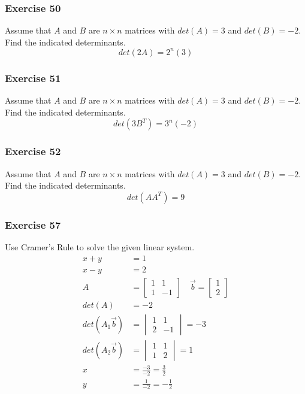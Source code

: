 \documentclass{math}
\begin{document}
\subsubsection*{Exercise 50}
Assume that \( A \) and \( B \) are \( n\times n \) matrices with
\( det(A) = 3 \) and \( det(B) = -2 \). Find the indicated determinants.
\[ det(2A) = 2^n(3) \]

\subsubsection*{Exercise 51}
Assume that \( A \) and \( B \) are \( n\times n \) matrices with
\( det(A) = 3 \) and \( det(B) = -2 \). Find the indicated determinants.
\[ det(3B^T) = 3^n(-2) \]

\subsubsection*{Exercise 52}
Assume that \( A \) and \( B \) are \( n\times n \) matrices with
\( det(A) = 3 \) and \( det(B) = -2 \). Find the indicated determinants.
\[ det(AA^T) = 9 \]

\subsubsection*{Exercise 57}
Use Cramer's Rule to solve the given linear system.
\begin{align*}
  x+y &= 1 \\
  x-y &= 2 \\
  A &= \begin{bmatrix}1 & 1 \\ 1 & -1\end{bmatrix} \quad
    \vec{b} = \begin{bmatrix}1 \\ 2\end{bmatrix} \\
  det(A) &= -2 \\
  det(A_1\vec{b}) &= \begin{vmatrix}1 & 1 \\ 2 & -1\end{vmatrix} = -3 \\
  det(A_2\vec{b}) &= \begin{vmatrix}1 & 1 \\ 1 & 2\end{vmatrix} = 1 \\
  x &= \frac{-3}{-2} = \frac{3}{2} \\
  y &= \frac{1}{-2} = -\frac{1}{2}
\end{align*}
\end{document}
